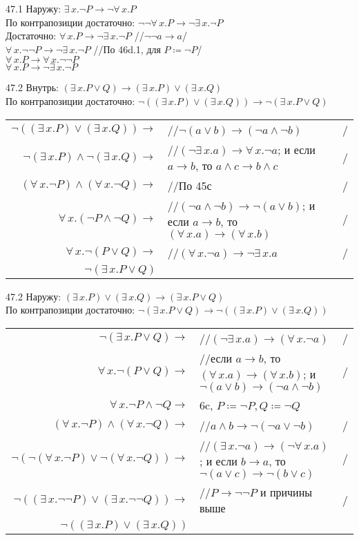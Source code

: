 \documentclass[12pt]{article}
\begin{document}
47.1 Наружу: $\exists\,x.\neg P\to\neg\forall\,x.P$\\
По контрапозиции достаточно: $\neg\neg\forall\,x.P\to\neg\exists\,x.\neg P$\\
Достаточно: $\forall\,x.P\to\neg\exists\,x.\neg P$ //$\neg\neg a\to a$/\\
$\forall\,x.\neg\neg P\to\neg\exists\,x.\neg P$ //По 46d.1, для $P\coloneqq\neg P$/\\
$\forall\,x.P\to\forall\,x.\neg\neg P$\\
$\forall\,x.P\to\neg\exists\,x.\neg P$

47.2 Внутрь: $(\exists\,x.P\vee Q)\to(\exists\,x.P)\vee(\exists\,x.Q)$\\
По контрапозиции достаточно: $\neg((\exists\,x.P)\vee(\exists\,x.Q))\to\neg(\exists\,x.P\vee Q)$\\
\begin{tabular*}{\textwidth}{r l l}
	$\neg((\exists\,x.P)\vee(\exists\,x.Q))\to$&//$\neg(a\vee b)\to(\neg a\wedge\neg b)$&/\\
	$\neg(\exists\,x.P)\wedge\neg(\exists\,x.Q)\to$&//$(\neg\exists\,x.a)\to\forall\,x.\neg a$; и если $a\to b$, то $a\wedge c\to b\wedge c$&/\\
	$(\forall\,x.\neg P)\wedge(\forall\,x.\neg Q)\to$&//По 45с&/\\
	$\forall\,x.(\neg P\wedge\neg Q)\to$&//$(\neg a\wedge\neg b)\to\neg(a\vee b)$; и если $a\to b$, то $(\forall\,x.a)\to(\forall\,x.b)$&/\\
	$\forall\,x.\neg(P\vee Q)\to$&//$(\forall\,x.\neg a)\to\neg\exists\,x.a$&/\\
	$\neg(\exists\,x.P\vee Q)$
\end{tabular*}
47.2 Наружу: $(\exists\,x.P)\vee(\exists\,x.Q)\to(\exists\,x.P\vee Q)$\\
По контрапозиции достаточно: $\neg(\exists\,x.P\vee Q)\to\neg((\exists\,x.P)\vee(\exists\,x.Q))$\\
\begin{tabular*}{\textwidth}{r l l}
	$\neg(\exists\,x.P\vee Q)\to$&//$(\neg\exists\,x.a)\to(\forall\,x.\neg a)$&/\\
	$\forall\,x.\neg(P\vee Q)\to$&//если $a\to b$, то $(\forall\,x.a)\to(\forall\,x.b)$; и $\neg(a\vee b)\to (\neg a\wedge\neg b)$&/\\
	$\forall\,x.\neg P\wedge\neg Q\to$&6c, $P\coloneqq\neg P, Q\coloneqq\neg Q$&\\
	$(\forall\,x.\neg P)\wedge(\forall\,x.\neg Q)\to$&//$a\wedge b\to\neg(\neg a\vee\neg b)$&/\\
	$\neg(\neg(\forall\,x.\neg P)\vee\neg(\forall\,x.\neg Q))\to$&//$(\exists\,x.\neg a)\to(\neg\forall\,x.a)$; и если $b\to a$, то $\neg(a\vee c)\to\neg(b\vee c)$&/\\
	$\neg((\exists\,x.\neg\neg P)\vee(\exists\,x.\neg\neg Q))\to$&//$P\to\neg\neg P$ и причины выше&/\\
	$\neg((\exists\,x.P)\vee(\exists\,x.Q))$
\end{tabular*}
\end{document}
